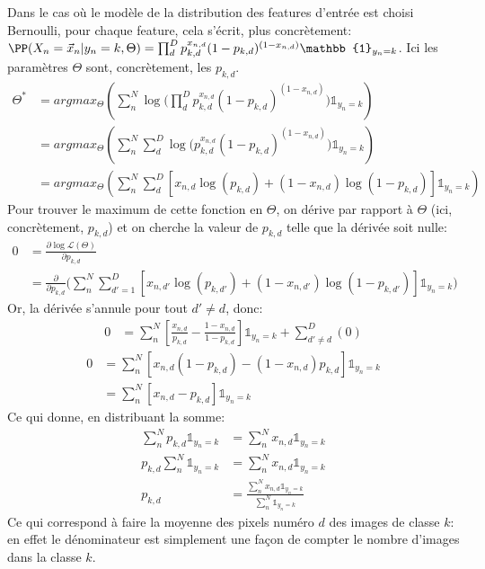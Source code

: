 \documentclass[french,twoside]{article}
\begin{document}
Dans le cas où le modèle de la distribution des features d'entrée est choisi Bernoulli, pour chaque feature, cela s'écrit, plus concrètement:
$\PP(X_n=\vec{x}_n | y_n=k, \Theta) = \prod_d^D p_{k,d}^{x_{n,d}} (1-p_{k,d})^{(1-x_{n,d})} \mathbb{1}_{y_n=k} $.
Ici les paramètres $\Theta$ sont, concrètement, les $p_{k,d}$.
\begin{align}
\Theta^*
&= argmax_\Theta \left( \sum_n^N \log \Big( \prod_d^D p_{k,d}^{x_{n,d}} (1-p_{k,d})^{(1-x_{n,d})} \Big)\mathbb{1}_{y_n=k} \right) \\
&= argmax_\Theta \left( \sum_n^N \sum_d^D \log \Big( p_{k,d}^{x_{n,d}} (1-p_{k,d})^{(1-x_{n,d})} \Big)\mathbb{1}_{y_n=k} \right) \\
&= argmax_\Theta \left( \sum_n^N \sum_d^D \left[ x_{n,d}\log(p_{k,d}) + (1-x_{n,d})\log(1-p_{k,d}) \right] \mathbb{1}_{y_n=k} \right)
\end{align}
Pour trouver le maximum de cette fonction en $\Theta$, on dérive par rapport à $\Theta$ (ici, concrètement, $p_{k,d}$) et on cherche la valeur de $p_{k,d}$ telle que la dérivée soit nulle:
\begin{align}
0 &= \frac{\partial \log \mathcal{L}(\Theta)}{\partial p_{k,d}} \\
&=\frac{\partial}{\partial p_{k,d}}
\Big( \sum_n^N \sum_{d'=1}^D \left[ x_{n,d'}\log(p_{k,d'}) + (1-x_{n,d'})\log(1-p_{k,d'}) \right] \mathbb{1}_{y_n=k} \Big)
\end{align}
Or, la dérivée s'annule pour tout $d' \neq d$, donc:
\begin{align}
0 &=
 \sum_n^N \left[ \frac{x_{n,d}}{p_{k,d}} - \frac{1-x_{n,d}}{1-p_{k,d}} \right] \mathbb{1}_{y_n=k} + \sum_{d'\neq d}^D (0)
\end{align}
\begin{align}
0
&= \sum_n^N  \left[ x_{n,d}(1-p_{k,d}) - (1-x_{n,d})p_{k,d} \right] \mathbb{1}_{y_n=k} \\
&=
\sum_n^N  \left[ x_{n,d} - p_{k,d} \right] \mathbb{1}_{y_n=k}
\end{align}
Ce qui donne, en distribuant la somme:
\begin{align}
\sum_n^N  p_{k,d} \mathbb{1}_{y_n=k}
&=
\sum_n^N x_{n,d}  \mathbb{1}_{y_n=k}\\
p_{k,d} \sum_n^N  \mathbb{1}_{y_n=k}
&=
\sum_n^N x_{n,d}  \mathbb{1}_{y_n=k}\\
p_{k,d}
&=\frac{\sum_n^N x_{n,d}  \mathbb{1}_{y_n=k}}{\sum_n^N  \mathbb{1}_{y_n=k} }
\end{align}
Ce qui correspond à faire la moyenne des pixels numéro $d$ des images de classe $k$: en effet le dénominateur est simplement une façon de compter le nombre d'images dans la classe $k$.
\end{document}
